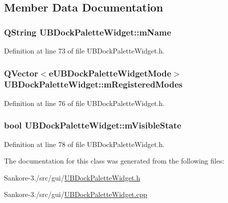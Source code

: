 \subsection{Member Data Documentation}
\hypertarget{class_u_b_dock_palette_widget_a6dbb15ff090986f543d2614778c343cb}{
\subsubsection[{m\-Name}]{\setlength{\rightskip}{0pt plus 5cm}Q\-String U\-B\-Dock\-Palette\-Widget\-::m\-Name\hspace{0.3cm}{\ttfamily [protected]}}}\label{d1/d54/class_u_b_dock_palette_widget_a6dbb15ff090986f543d2614778c343cb}


Definition at line 73 of file U\-B\-Dock\-Palette\-Widget.\-h.

\hypertarget{class_u_b_dock_palette_widget_a53e0db7a927af2934470ea519f67657d}{
\subsubsection[{m\-Registered\-Modes}]{\setlength{\rightskip}{0pt plus 5cm}Q\-Vector$<${\bf e\-U\-B\-Dock\-Palette\-Widget\-Mode}$>$ U\-B\-Dock\-Palette\-Widget\-::m\-Registered\-Modes\hspace{0.3cm}{\ttfamily [protected]}}}\label{d1/d54/class_u_b_dock_palette_widget_a53e0db7a927af2934470ea519f67657d}


Definition at line 76 of file U\-B\-Dock\-Palette\-Widget.\-h.

\hypertarget{class_u_b_dock_palette_widget_a6625e60cb42b4fc13a91b307e24c9e3d}{
\subsubsection[{m\-Visible\-State}]{\setlength{\rightskip}{0pt plus 5cm}bool U\-B\-Dock\-Palette\-Widget\-::m\-Visible\-State\hspace{0.3cm}{\ttfamily [protected]}}}\label{d1/d54/class_u_b_dock_palette_widget_a6625e60cb42b4fc13a91b307e24c9e3d}


Definition at line 78 of file U\-B\-Dock\-Palette\-Widget.\-h.



The documentation for this class was generated from the following files\-:\begin{DoxyCompactItemize}
\item 
Sankore-\/3./src/gui/\hyperlink{_u_b_dock_palette_widget_8h}{U\-B\-Dock\-Palette\-Widget.\-h}\item 
Sankore-\/3./src/gui/\hyperlink{_u_b_dock_palette_widget_8cpp}{U\-B\-Dock\-Palette\-Widget.\-cpp}\end{DoxyCompactItemize}
